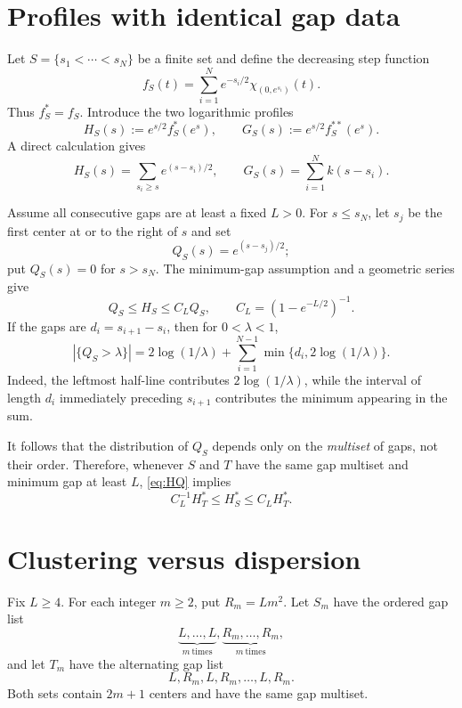 \documentclass[11pt]{article}
\begin{document}
\section{Profiles with identical gap data}

Let $S=\{s_1<\cdots<s_N\}$ be a finite set and define the decreasing step
function
\begin{equation}\label{eq:fS}
 f_S(t)=\sum_{i=1}^N e^{-s_i/2}\chi_{(0,e^{s_i})}(t).
\end{equation}
Thus $f_S^*=f_S$.  Introduce the two logarithmic profiles
\[
 H_S(s):=e^{s/2}f_S^*(e^s),
 \qquad
 G_S(s):=e^{s/2}f_S^{**}(e^s).
\]
A direct calculation gives
\begin{equation}\label{eq:profiles}
 H_S(s)=\sum_{s_i\geq s}e^{(s-s_i)/2},
 \qquad
 G_S(s)=\sum_{i=1}^N k(s-s_i).
\end{equation}

Assume all consecutive gaps are at least a fixed $L>0$.  For $s\leq s_N$,
let $s_j$ be the first center at or to the right of $s$ and set
\[
 Q_S(s)=e^{(s-s_j)/2};
\]
put $Q_S(s)=0$ for $s>s_N$.  The minimum-gap assumption and a geometric
series give
\begin{equation}\label{eq:HQ}
 Q_S\leq H_S\leq C_LQ_S,
 \qquad C_L=(1-e^{-L/2})^{-1}.
\end{equation}
If the gaps are $d_i=s_{i+1}-s_i$, then for $0<\lambda<1$,
\begin{equation}\label{eq:distribution}
 |\{Q_S>\lambda\}|
 =2\log(1/\lambda)
  +\sum_{i=1}^{N-1}\min\{d_i,2\log(1/\lambda)\}.
\end{equation}
Indeed, the leftmost half-line contributes $2\log(1/\lambda)$, while the
interval of length $d_i$ immediately preceding $s_{i+1}$ contributes the
minimum appearing in the sum.

It follows that the distribution of $Q_S$ depends only on the \emph{multiset}
of gaps, not their order.  Therefore, whenever $S$ and $T$ have the same gap
multiset and minimum gap at least $L$, \eqref{eq:HQ} implies
\begin{equation}\label{eq:Hstar}
 C_L^{-1}H_T^*\leq H_S^*\leq C_LH_T^*.
\end{equation}

\section{Clustering versus dispersion}

Fix $L\geq4$.  For each integer $m\geq2$, put $R_m=Lm^2$.  Let $S_m$ have
the ordered gap list
\begin{equation}\label{eq:cluster-gaps}
 \underbrace{L,\ldots,L}_{m\ \mathrm{times}},
 \underbrace{R_m,\ldots,R_m}_{m\ \mathrm{times}},
\end{equation}
and let $T_m$ have the alternating gap list
\begin{equation}\label{eq:spread-gaps}
 L,R_m,L,R_m,\ldots,L,R_m.
\end{equation}
Both sets contain $2m+1$ centers and have the same gap multiset.
\end{document}
